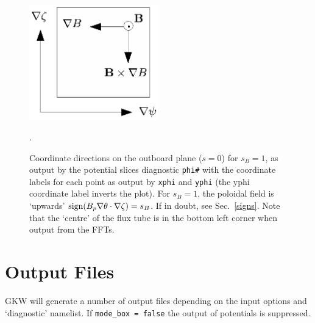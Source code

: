 \documentclass{report}
\begin{document}
 \begin{figure}
 \label{directions}
 \begin{center}
 \includegraphics[width=0.5\textwidth]{directions.eps}
 \caption{Coordinate directions on the outboard plane ($s=0$) for $s_B=1$, as output by the potential slices diagnostic \texttt{phi\#} with the coordinate labels for each point as output by \texttt{xphi} and \texttt{yphi} (the yphi coordinate label inverts the plot). For $s_B=1$, the poloidal field is `upwards' ${\rm sign}(B_p \nabla \theta \cdot \nabla \zeta)= s_B$. If in doubt, see Sec.~\ref{signs}.  Note that the `centre' of the flux tube is in the bottom left corner when output from the FFTs.}.

 \end{center}
 \end{figure}

\section{Output Files}%
GKW will generate a number of output files depending on the input options and `diagnostic' namelist.  If \texttt{mode\_box = false} the output of potentials is suppressed.

\end{document}
